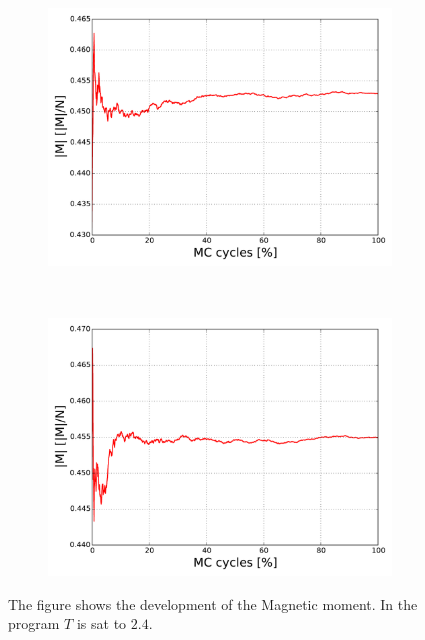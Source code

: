 \begin{figure}[H]
    \centering
    \begin{subfigure}{0.5\textwidth}
        \centering
        \includegraphics[width=\linewidth]{result/bilder/20x20/M-N20-T24}
        \caption{}
    \end{subfigure}%
    ~ 
    \begin{subfigure}{0.5\textwidth}
        \centering
        \includegraphics[width=\linewidth]{result/bilder/20x20/M-N20-T24-RNG}
        \caption{}
    \end{subfigure}
    \caption{The figure shows the development of the Magnetic moment. In the program $T$ is sat to $2.4$.}
    \label{fig:}
\end{figure}

